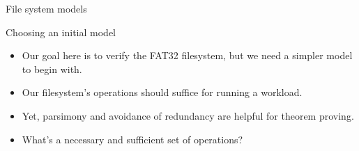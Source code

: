 \documentclass{beamer}
\begin{document}
\begin{frame}{File system models}
\end{frame}

\begin{frame}{Choosing an initial model}
  \begin{itemize}
    \item Our goal here is to verify the FAT32 filesystem, but we need
      a simpler model to begin with.
    \item Our filesystem's operations should suffice for running a
      workload.
    \item Yet, parsimony and avoidance of redundancy are helpful for
      theorem proving.
    \item What's a necessary and sufficient set of operations?
  \end{itemize}
\end{frame}

\end{document}

